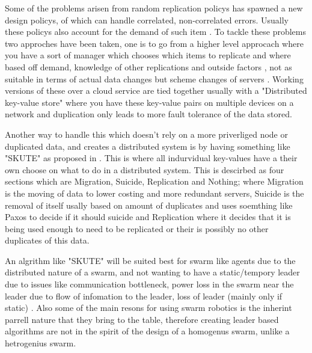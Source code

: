 \documentclass{UoYCSproject}
\begin{document}
Some of the problems arisen from random replication policys has spawned a new design policys, of which can handle correlated, non-correlated errors.
Usually these policys also account for the demand of such item \cite{Avalability storage, Distributed Storage}.
To tackle these problems two approches have been taken, one is to go from a higher level approcach where you have a sort of manager which chooses which items to replicate and where based off demand, knowledge of other replications and outside factors \cite{Avalability storage, Patent}, not as suitable in terms of actual data changes but scheme changes of servers \cite{Scheme changes}.
Working versions of these over a cloud service are tied together usually with a "Distributed key-value store"  \cite{Key-Value} where you have these key-value pairs on multiple devices on a network and duplication only leads to more fault tolerance of the data stored.

Another way to handle this which doesn't rely on a more priverliged node or duplicated data, and creates a distributed system is by having something like "SKUTE" as proposed in \cite{Distributed Storage}.
This is where all indurvidual key-values have a their own choose on what to do in a distributed system.
This is descirbed as four sections which are Migration, Suicide, Replication and Nothing; where Migration is the moving of data to lower costing and more redundant servers, Suicide is the removal of itself usally based on amount of duplicates and uses soemthing like Paxos \cite{Paxos} to decide if it should suicide and Replication where it decides that it is being used enough to need to be replicated or their is possibly no other duplicates of this data.

An algrithm like "SKUTE" \cite{Distributed Storage} will be suited best for swarm like agents due to the distributed nature of a swarm, and not wanting to have a static/tempory leader due to issues like communication bottleneck, power loss in the swarm near the leader due to flow of infomation to the leader, loss of leader (mainly only if static) \cite{Swarm robotics reviewed, Swarm intellegiegence}.
Also some of the main resons for using swarm robotics is the inherint parrell nature that they bring to the table, therefore creating leader based algorithms are not in the spirit of the design of a homogenus swarm, unlike a hetrogenius swarm.
\end{document}

